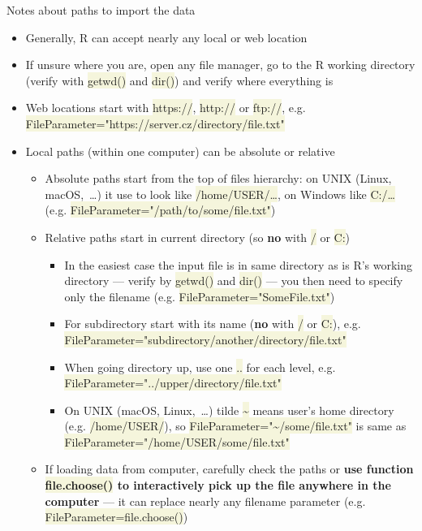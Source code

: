 \documentclass[compress, xelatex, 11pt, xcolor=svgnames, aspectratio=169,
	hyperref={
		bookmarks=true,
		unicode=true,
		colorlinks=true,
		pdftitle={Molecular data in R},
		plainpages=false,
		pdfauthor={Vojtech Zeisek},
		pdfsubject={Course about phylogeny and evolution in R},
		pdfcreator={XeLaTeX},
		pdfkeywords={R, evolution, phylogeny, molecular data},
		linkcolor=Crimson, %
		anchorcolor=Magenta, %
		citecolor=Magenta, %
		filecolor=Magenta, %
		menucolor=Magenta, %
		urlcolor=DodgerBlue, %
		},
	url={hyphens, lowtilde} %
	]{beamer}
\renewcommand{\texttt}[1]{\colorbox{Beige}{{\ttfamily #1}}}
\begin{document}
\begin{frame}[allowframebreaks]{Notes about paths to import the data}
	\label{path}
	\begin{itemize}
		\item Generally, R can accept nearly any local or web location
		\item If unsure where you are, open any file manager, go to the R working directory (verify with \texttt{getwd()} and \texttt{dir()}) and verify where everything is
		\item Web locations start with \texttt{https://}, \texttt{http://} or \texttt{ftp://}, e.g. \texttt{FileParameter="https://server.cz/directory/file.txt"}
		\item Local paths (within one computer) can be absolute or relative
		\begin{itemize}
			\item Absolute paths start from the top of files hierarchy: on UNIX (Linux, macOS,~\ldots) it use to look like \texttt{/home/USER/\ldots}, on Windows like \texttt{C:/\ldots} (e.g. \texttt{FileParameter="/path/to/some/file.txt"})
			\item Relative paths start in current directory (so \textbf{no} with \texttt{/} or \texttt{C:})
			\begin{itemize}
	\item In the easiest case the input file is in same directory as is R's working directory --- verify by \texttt{getwd()} and \texttt{dir()} --- you then need to specify only the filename (e.g. \texttt{FileParameter="SomeFile.txt"})
	\item For subdirectory start with its name (\textbf{no} with \texttt{/} or \texttt{C:}), e.g. \texttt{FileParameter="subdirectory/another/directory/file.txt"}
	\item When going directory up, use one \texttt{..} for each level, e.g. \texttt{FileParameter="../upper/directory/file.txt"}
	\item On UNIX (macOS, Linux,~\ldots) tilde \texttt{\textasciitilde} means user's home directory (e.g. \texttt{/home/USER/}), so \texttt{FileParameter="\textasciitilde/some/file.txt"} is same as \texttt{FileParameter="/home/USER/some/file.txt"}
			\end{itemize}
			\item If loading data from computer, carefully check the paths or \textbf{use function \texttt{file.choose()} to interactively pick up the file anywhere in the computer} --- it can replace nearly any filename parameter (e.g. \alert{\texttt{FileParameter=file.choose()}})

\end{itemize}
\end{itemize}
\end{frame}
\end{document}
